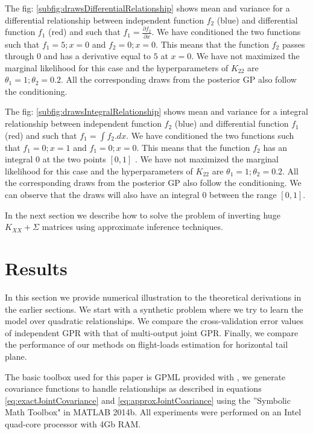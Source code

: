 The fig: \ref{subfig:drawsDifferentialRelationship} shows mean and variance for a differential relationship between independent function \(f_{2}\) (blue) and differential function \(f_{1}\) (red) and such that \(f_{1} = \frac{\partial f_{2}}{\partial x}\). We have conditioned the two functions such that \(f_{1} = 5; x = 0\) and \(f_{2} = 0; x = 0\). This means that the function \(f_{2}\) passes through \(0\) and has a derivative equal to \(5\) at \(x = 0\). We have not maximized the marginal likelihood for this case and the hyperparameters of \(K_{22}\) are \(\theta_{1} = 1; \theta_{2} = 0.2\). All the corresponding draws from the posterior GP also follow the conditioning. 

The fig: \ref{subfig:drawsIntegralRelationship} shows mean and variance for a integral relationship between independent function \(f_{2}\) (blue) and differential function \(f_{1}\) (red) and such that \(f_{1} = \int f_{2} . dx\). We have conditioned the two functions such that \(f_{1} = 0; x = 1\) and \(f_{1} = 0; x = 0\). This means that the function \(f_{2}\) has an integral \(0\) at the two points \([0, 1]\) . We have not maximized the marginal likelihood for this case and the hyperparameters of \(K_{22}\) are \(\theta_{1} = 1; \theta_{2} = 0.2\). All the corresponding draws from the posterior GP also follow the conditioning. We can observe that the draws will also have an integral \(0\) between the range \([0, 1]\).

In the next section we describe how to solve the problem of inverting huge \(K_{XX} + \Sigma\) matrices using approximate inference techniques.

\section{Results}\label{sec:results}
In this section we provide numerical illustration to the theoretical derivations in the earlier sections. We start with a synthetic problem where we try to learn the model over quadratic relationships. We compare the cross-validation error values of independent GPR with that of multi-output joint GPR. Finally, we compare the performance of our methods on flight-loads estimation for horizontal tail plane.

The basic toolbox used for this paper is GPML provided with \cite{Rasmussen2005}, we generate covariance functions to handle relationships as described in equations \ref{eq:exactJointCovariance} and \ref{eq:approxJointCoariance} using the ''Symbolic Math Toolbox" in MATLAB 2014b. All experiments were performed on an Intel quad-core processor with 4Gb RAM.


